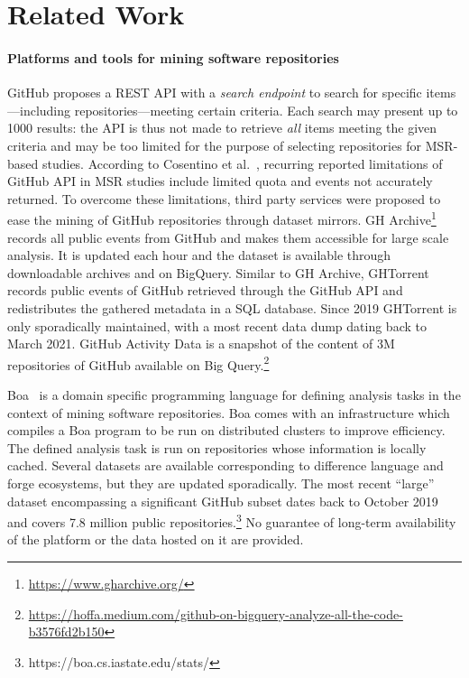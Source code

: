 \section{Related Work}
\label{sec:related_work}
\paragraph{Platforms and tools for mining software repositories}

GitHub proposes a REST API with a \textit{search endpoint} to search for specific items---including repositories---meeting certain criteria.
Each search may present up to \num{1000} results: the API is thus not made to retrieve \emph{all} items meeting the given criteria and may be too limited for the purpose of selecting repositories for MSR-based studies. According to Cosentino et al.~\cite{cosentino2016findings}, recurring reported limitations of GitHub API in MSR studies include limited quota and events not accurately returned.
To overcome these limitations, third party services were proposed to ease the mining of GitHub repositories through dataset mirrors.
GH Archive\footnote{\url{https://www.gharchive.org/}} records all public events from GitHub and makes them accessible for large scale analysis.
It is updated each hour and the dataset is available through downloadable archives and on BigQuery.
Similar to GH Archive, GHTorrent~\cite{gousios2013ghtorent} records public events of GitHub retrieved through the GitHub API and redistributes the gathered metadata in a SQL database.
Since 2019 GHTorrent is only sporadically maintained, with a most recent data dump dating back to March 2021.
GitHub Activity Data is a snapshot of the content of 3M repositories of GitHub available on Big Query.\footnote{\url{https://hoffa.medium.com/github-on-bigquery-analyze-all-the-code-b3576fd2b150}}

Boa~\cite{dyer2015boa} is a domain specific programming language for defining analysis tasks in the context of mining software repositories.
Boa comes with an infrastructure which compiles a Boa program to be run on distributed clusters to improve efficiency.
The defined analysis task is run on repositories whose information is locally cached.
Several datasets are available corresponding to difference language and forge ecosystems, but they are updated sporadically.
The most recent ``large'' dataset encompassing a significant GitHub subset dates back to October 2019 and covers 7.8 million public repositories.\footnote{\url{}https://boa.cs.iastate.edu/stats/}
No guarantee of long-term availability of the platform or the data hosted on it are provided.

